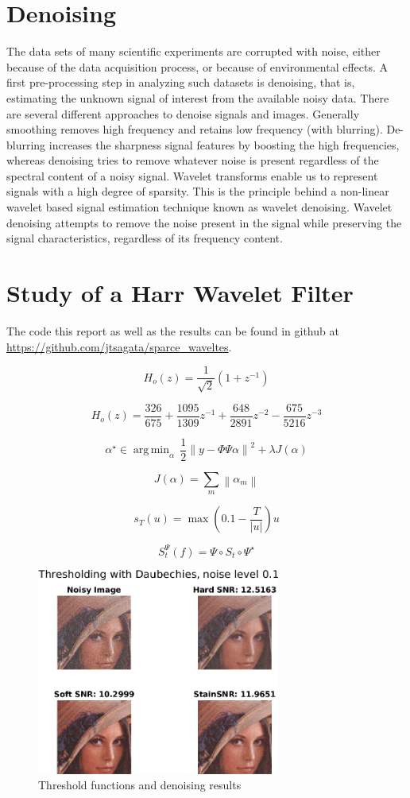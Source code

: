 \documentclass[a4paper,12pt]{article}
\DeclareMathOperator*{\argmin}{arg\,min}
\begin{document}
\section{Denoising}
The data sets of many scientific experiments are corrupted with noise, either because of the data acquisition process, or because of environmental effects. A first pre-processing step in analyzing such datasets is denoising, that is, estimating the unknown signal of interest from the available noisy data. There are several different approaches to denoise signals and images. Generally smoothing removes high frequency and retains low frequency (with blurring). De-blurring increases the sharpness signal features by boosting the high frequencies, whereas denoising tries to remove whatever noise is present regardless of the spectral content of a noisy signal. Wavelet transforms enable us to represent signals with a high degree of sparsity. This is the principle behind a non-linear wavelet based signal estimation technique known as wavelet denoising. Wavelet denoising attempts to remove the noise present in the signal while preserving the signal characteristics, regardless of its frequency content.

\section{Study of a Harr Wavelet Filter}
The code this report as well as the results can be found in  github at \url{https://github.com/jtsagata/sparce_waveltes}.

$$
H_o(z) = \frac{1}{\sqrt{2}}\left( 1 + z^{-1}\right)
$$

$$
H_o(z) = \frac{326}{675} + \frac{1095}{1309}z^{-1} + \frac{648}{2891}z^{-2} - \frac{675}{5216}z^{-3}
$$


$$
\alpha^{\star} \in \argmin_{\alpha}\, \frac{1}{2}
\left\|{}
y-\Phi\Psi\alpha
\right\|^{2} + \lambda{}J(\alpha)
$$

$$
J(\alpha) = \sum_m
\left\|{}
\alpha_m
\right\|
$$

$$
s_T(u) = \max\left( 0.1 - \frac{T}{|u|} \right) u
$$


$$
S_t^{\Psi}(f) = \Psi \circ S_t \circ \Psi^{\star}
$$

\begin{figure}[t]
        \centering
        \includegraphics[width=8cm]{../Results/leana_threshold.png}
        \caption{Threshold functions and denoising results}
		\label{fig:threshold}
\end{figure}
\end{document}
